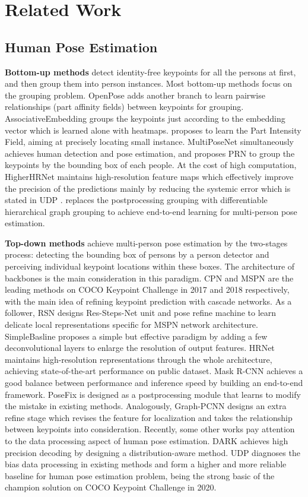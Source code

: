 \documentclass[final]{cvpr}
\begin{document}
\section{Related Work}
\label{sec:RW}
\subsection{Human Pose Estimation}
\textbf{Bottom-up methods} detect identity-free keypoints for all the persons at first, and then group them into person instances. Most bottom-up methods focus on the grouping problem. OpenPose \cite{OpenPose} adds another branch to learn pairwise relationships (part affinity fields) between keypoints for grouping. AssociativeEmbedding \cite{AssociativeEmbedding} groups the keypoints just according to the embedding vector which is learned alone with heatmaps. \cite{PIFPAF} proposes to learn the Part Intensity Field, aiming at precisely locating small instance. MultiPoseNet \cite{MultiPoseNet} simultaneously achieves human detection and pose estimation, and proposes PRN to group the keypoints by the bounding box of each people. At the cost of high computation, HigherHRNet \cite{Higher} maintains high-resolution feature maps which effectively improve the precision of the predictions mainly by reducing the systemic error which is stated in UDP \cite{UDP}. \cite{DHGG} replaces the postprocessing grouping with differentiable hierarchical graph grouping to achieve end-to-end learning for multi-person pose estimation.

\textbf{Top-down methods} achieve multi-person pose estimation by the two-stages process: detecting the bounding box of persons by a person detector and perceiving individual keypoint locations within these boxes. The architecture of backbones is the main consideration in this paradigm. CPN \cite{CPN} and MSPN \cite{MSPN} are the leading methods on COCO Keypoint Challenge in 2017 and 2018 respectively, with the main idea of refining keypoint prediction with cascade networks. As a follower, RSN \cite{RSN} designs Res-Steps-Net unit and pose refine machine to learn delicate local representations specific for MSPN network architecture. SimpleBasline \cite{SBNet} proposes a simple but effective paradigm by adding a few deconvolutional layers to enlarge the resolution of output features. HRNet \cite{HRNet} maintains high-resolution representations through the whole architecture, achieving state-of-the-art performance on public dataset. Mask R-CNN \cite{Mask-RCNN} achieves a good balance between performance and inference speed by building an end-to-end framework. PoseFix \cite{Posefix} is designed as a postprocessing module that learns to modify the mistake in existing methods. Analogously, Graph-PCNN \cite{Graph-PCNN} designs an extra refine stage which revises the feature for localization and takes the relationship between keypoints into consideration. Recently, some other works pay attention to the data processing aspect of human pose estimation. DARK \cite{DARK} achieves high precision decoding by designing a distribution-aware method. UDP \cite{UDP} diagnoses the bias data processing in existing methods and form a higher and more reliable baseline for human pose estimation problem, being the strong basic of the champion solution on COCO Keypoint Challenge in 2020.
\end{document}
